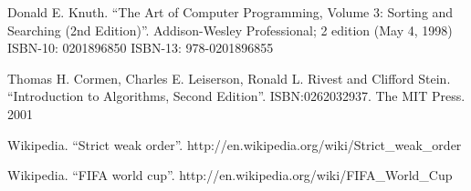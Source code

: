 \documentclass{article}
\begin{document}
\begin{thebibliography}{99}

Donald E. Knuth. ``The Art of Computer Programming, Volume 3: Sorting and Searching (2nd Edition)''. Addison-Wesley Professional; 2 edition (May 4, 1998) ISBN-10: 0201896850 ISBN-13: 978-0201896855

Thomas H. Cormen, Charles E. Leiserson, Ronald L. Rivest and Clifford Stein. 
``Introduction to Algorithms, Second Edition''. ISBN:0262032937. The MIT Press. 2001

Wikipedia. ``Strict weak order''. http://en.wikipedia.org/wiki/Strict\_weak\_order

Wikipedia. ``FIFA world cup''. http://en.wikipedia.org/wiki/FIFA\_World\_Cup

\end{thebibliography}

\ifx\wholebook\relax\else
\end{document}
